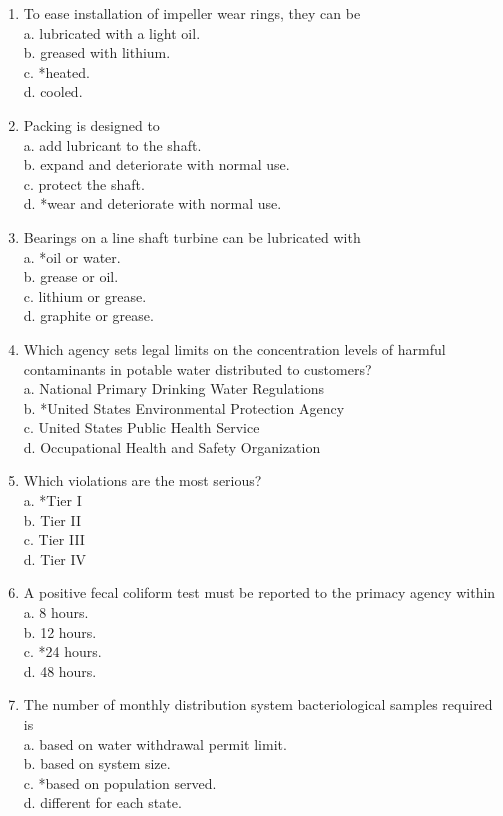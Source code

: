 \documentclass[10pt]{article}
\begin{document}
\begin{enumerate}
  \item To ease installation of impeller wear rings, they can be\\
a. lubricated with a light oil.\\
b. greased with lithium.\\
c. *heated.\\
d. cooled.

  \item Packing is designed to\\
a. add lubricant to the shaft.\\
b. expand and deteriorate with normal use.\\
c. protect the shaft.\\
d. *wear and deteriorate with normal use.

  \item Bearings on a line shaft turbine can be lubricated with\\
a. *oil or water.\\
b. grease or oil.\\
c. lithium or grease.\\
d. graphite or grease.

  \item Which agency sets legal limits on the concentration levels of harmful contaminants in potable water distributed to customers?\\
a. National Primary Drinking Water Regulations\\
b. *United States Environmental Protection Agency\\
c. United States Public Health Service\\
d. Occupational Health and Safety Organization

  \item Which violations are the most serious?\\
a. *Tier I\\
b. Tier II\\
c. Tier III\\
d. Tier IV

  \item A positive fecal coliform test must be reported to the primacy agency within\\
a. 8 hours.\\
b. 12 hours.\\
c. *24 hours.\\
d. 48 hours.

  \item The number of monthly distribution system bacteriological samples required is\\
a. based on water withdrawal permit limit.\\
b. based on system size.\\
c. *based on population served.\\
d. different for each state.


\end{enumerate}
\end{document}
